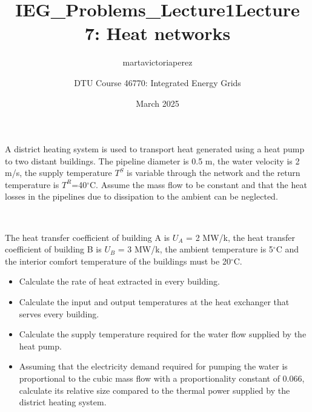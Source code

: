\documentclass[10pt]{article}
\title{IEG_Problems_Lecture1}
\author{martavictoriaperez }
\date{March 2025}
\newenvironment{problem}[2][Problem]{\begin{trivlist}
\item[\hskip \labelsep {\bfseries #1}\hskip \labelsep {\bfseries #2.}]}{\end{trivlist}}
\begin{document}
 
\title{\textbf{Lecture 7: Heat networks}}
\author{
DTU Course 46770: Integrated Energy Grids }
\maketitle

\begin{problem}{7.1}

A district heating system is used to transport heat generated using a heat pump to two distant buildings. The pipeline diameter is 0.5 m, the water velocity is 2 m/s, the supply temperature $T^S$ is variable through the network and the return temperature is $T^R$=40$^{\circ}$C. Assume the mass flow to be constant and that the heat losses in the pipelines due to dissipation to the ambient can be neglected.

\

The heat transfer coefficient of building A is $U_A$ = 2 MW/k, the heat transfer coefficient of building B is $U_B$ = 3 MW/k, the ambient temperature is 5$^{\circ}$C and the interior comfort temperature of the buildings must be 20$^{\circ}$C.
\begin{itemize}

\item[a)] Calculate the rate of heat extracted in every building.

\item[b)]  Calculate the input and output temperatures at the heat exchanger that serves every building.

\item[c)]  Calculate the supply temperature required for the water flow supplied by the heat pump.

\item[d)]  Assuming that the electricity demand required for pumping the water is proportional to the cubic mass flow with a proportionality constant of 0.066, calculate its relative size compared to the thermal power supplied by the district heating system.

\end{itemize}


\end{problem}

\
\end{document}
